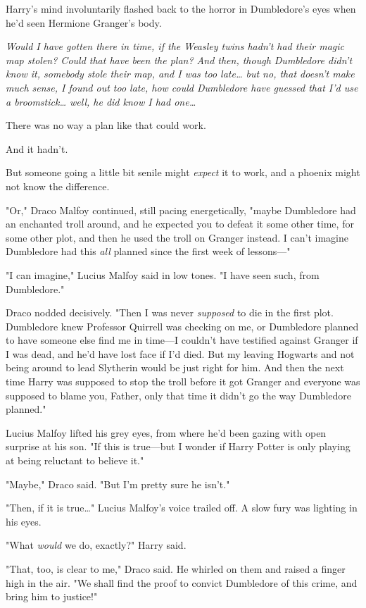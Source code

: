 Harry's mind involuntarily flashed back to the horror in Dumbledore's eyes when 
he'd seen Hermione Granger's body.

\emph{Would I have gotten there in time, if the Weasley twins hadn't had their 
magic map stolen? Could that have been the plan? And then, though Dumbledore 
didn't know it, somebody stole their map, and I was too late{\ldots} but no, 
that doesn't make much sense, I found out too late, how could Dumbledore have 
guessed that I'd use a broomstick{\ldots} well, he did know I had one{\ldots}}

There was no way a plan like that could work.

And it hadn't.

But someone going a little bit senile might \emph{expect} it to work, and a 
phoenix might not know the difference.

"Or," Draco Malfoy continued, still pacing energetically, "maybe Dumbledore had 
an enchanted troll around, and he expected you to defeat it some other time, 
for some other plot, and then he used the troll on Granger instead. I can't 
imagine Dumbledore had this \emph{all} planned since the first week of 
lessons---"

"I can imagine," Lucius Malfoy said in low tones. "I have seen such, from 
Dumbledore."

Draco nodded decisively. "Then I was never \emph{supposed} to die in the first 
plot. Dumbledore knew Professor Quirrell was checking on me, or Dumbledore 
planned to have someone else find me in time---I couldn't have testified 
against Granger if I was dead, and he'd have lost face if I'd died. But my 
leaving Hogwarts and not being around to lead Slytherin would be just right for 
him. And then the next time Harry was supposed to stop the troll before it got 
Granger and everyone was supposed to blame you, Father, only that time it 
didn't go the way Dumbledore planned."

Lucius Malfoy lifted his grey eyes, from where he'd been gazing with open 
surprise at his son. "If this is true---but I wonder if Harry Potter is only 
playing at being reluctant to believe it."

"Maybe," Draco said. "But I'm pretty sure he isn't."

"Then, if it is true{\ldots}" Lucius Malfoy's voice trailed off. A slow fury 
was lighting in his eyes.

"What \emph{would} we do, exactly?" Harry said.

"That, too, is clear to me," Draco said. He whirled on them and raised a finger 
high in the air. "We shall find the proof to convict Dumbledore of this crime, 
and bring him to justice!"


